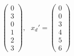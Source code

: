 \documentclass{article}
\begin{document}
\begin{itemize}
\begin{align*}
\begin{pmatrix}
            0\\
            3\\
            0\\
            1\\
            2\\
            3
        \end{pmatrix}
        ,\:\:\:
        x_d' = \begin{pmatrix}
            0\\
            0\\
            3\\
            4\\
            5\\
            6
        \end{pmatrix}       
    \end{align*}


\end{itemize}
\end{document}
